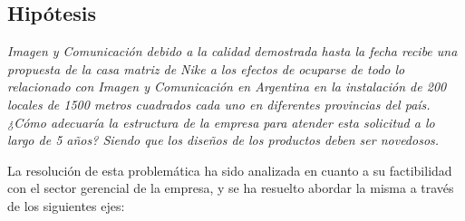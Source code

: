 \documentclass[a4paper,10pt,titlepage]{article}
\begin{document}

\newpage
\subsection{Hipótesis}
\vspace{1cm}
\indent \textit{Imagen y Comunicación debido a la calidad demostrada hasta la fecha recibe una propuesta de la casa matriz de Nike a los efectos de ocuparse de todo lo relacionado con Imagen y Comunicación en Argentina en la instalación de 200 locales de 1500 metros cuadrados cada uno en diferentes provincias del país. ¿Cómo adecuaría la estructura de la empresa para atender esta solicitud a lo largo de 5 años? Siendo que los diseños de los productos deben ser novedosos.}\\
\vspace{1cm}

\indent La resoluci\'on de esta problem\'atica ha sido analizada en cuanto a su factibilidad con el sector gerencial de la empresa, y se ha resuelto abordar la misma a trav\'es de los siguientes ejes:\\
\end{document}
